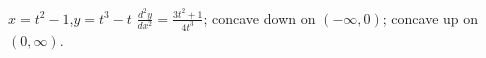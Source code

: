 {$x=t^2-1$,\quad  $y=t^3-t$}
{$\frac{d^2y}{dx^2}=\frac{3t^2+1}{4t^3}$; concave down on $(-\infty,0)$; concave up on $(0,\infty)$.}
